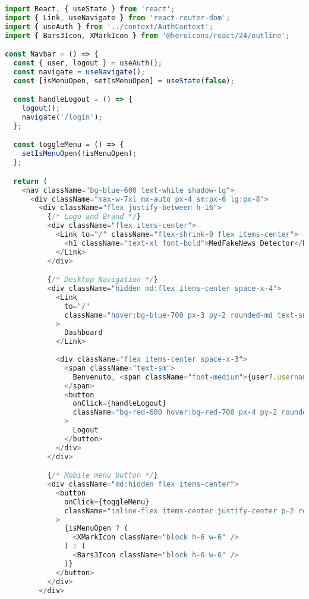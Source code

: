\documentclass[12pt,a4paper]{report}
\begin{document}
\begin{lstlisting}[language=JavaScript, caption=Navbar.jsx - Navigation Component]
import React, { useState } from 'react';
import { Link, useNavigate } from 'react-router-dom';
import { useAuth } from '../context/AuthContext';
import { Bars3Icon, XMarkIcon } from '@heroicons/react/24/outline';

const Navbar = () => {
  const { user, logout } = useAuth();
  const navigate = useNavigate();
  const [isMenuOpen, setIsMenuOpen] = useState(false);

  const handleLogout = () => {
    logout();
    navigate('/login');
  };

  const toggleMenu = () => {
    setIsMenuOpen(!isMenuOpen);
  };

  return (
    <nav className="bg-blue-600 text-white shadow-lg">
      <div className="max-w-7xl mx-auto px-4 sm:px-6 lg:px-8">
        <div className="flex justify-between h-16">
          {/* Logo and Brand */}
          <div className="flex items-center">
            <Link to="/" className="flex-shrink-0 flex items-center">
              <h1 className="text-xl font-bold">MedFakeNews Detector</h1>
            </Link>
          </div>

          {/* Desktop Navigation */}
          <div className="hidden md:flex items-center space-x-4">
            <Link 
              to="/" 
              className="hover:bg-blue-700 px-3 py-2 rounded-md text-sm font-medium transition-colors"
            >
              Dashboard
            </Link>
            
            <div className="flex items-center space-x-3">
              <span className="text-sm">
                Benvenuto, <span className="font-medium">{user?.username}</span>
              </span>
              <button
                onClick={handleLogout}
                className="bg-red-600 hover:bg-red-700 px-4 py-2 rounded-md text-sm font-medium transition-colors"
              >
                Logout
              </button>
            </div>
          </div>

          {/* Mobile menu button */}
          <div className="md:hidden flex items-center">
            <button
              onClick={toggleMenu}
              className="inline-flex items-center justify-center p-2 rounded-md hover:bg-blue-700 focus:outline-none focus:ring-2 focus:ring-inset focus:ring-white"
            >
              {isMenuOpen ? (
                <XMarkIcon className="block h-6 w-6" />
              ) : (
                <Bars3Icon className="block h-6 w-6" />
              )}
            </button>
          </div>
        </div>


\end{lstlisting}
\end{document}
